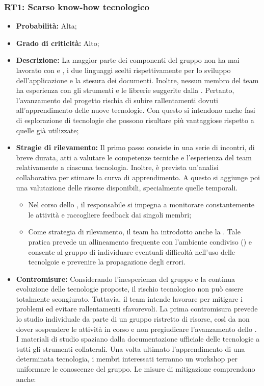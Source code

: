 \subsubsection{RT1: Scarso know-how tecnologico}
\begin{itemize}
    \item \textbf{Probabilità:} Alta;
    \item \textbf{Grado di criticità:} Alto;
    \item \textbf{Descrizione:} La maggior parte dei componenti del gruppo non ha mai lavorato con  e , i due linguaggi scelti rispettivamente per lo sviluppo dell'applicazione e la stesura dei documenti. Inoltre, nessun membro del team ha esperienza con gli strumenti e le librerie suggerite dalla . Pertanto, l'avanzamento del progetto rischia di subire rallentamenti dovuti all'apprendimento delle nuove tecnologie. Con questo si intendono anche fasi di esplorazione di tecnologie che possono risultare più vantaggiose rispetto a quelle già utilizzate;
    \item \textbf{Stragie di rilevamento:} Il primo passo consiste in una serie di incontri, di breve durata, atti a valutare le competenze tecniche e l'esperienza del team relativamente a ciascuna tecnologia. Inoltre, è prevista un'analisi collaborativa per stimare la curva di apprendimento. A questo si aggiunge poi una valutazione delle risorse disponibili, specialmente quelle temporali.
    \begin{itemize}
        \item Nel corso dello , il responsabile si impegna a monitorare constantemente le attività e raccogliere feedback dai singoli membri;
        \item Come strategia di rilevamento, il team ha introdotto anche la . Tale pratica prevede un allineamento frequente con l'ambiente condiviso () e consente al gruppo di individuare eventuali difficoltà nell'uso delle tecnolgoie e prevenire la propagazione degli errori. 
    \end{itemize}
    \item \textbf{Contromisure:} Considerando l'inesperienza del gruppo e la continua evoluzione delle tecnologie proposte, il rischio tecnologico non può essere totalmente scongiurato. Tuttavia, il team intende lavorare per mitigare i problemi ed evitare rallentamenti sfavorevoli. La prima contromisura prevede lo studio individuale da parte di un gruppo ristretto di risorse, così da non dover sospendere le attività in corso e non pregiudicare l'avanzamento dello . I materiali di studio spaziano dalla documentazione ufficiale delle tecnologie a tutti gli strumenti collaterali. Una volta ultimato l'apprendimento di una determinata tecnologia, i membri interessati terranno un workshop per uniformare le conoscenze del gruppo. Le misure di mitigazione comprendono anche:

\end{itemize}
